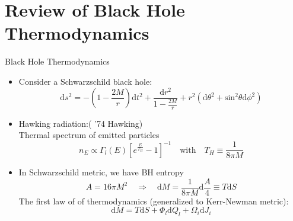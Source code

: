 \documentclass{beamer}
\begin{document}
\section{Review of Black Hole Thermodynamics}
\begin{frame}{Black Hole Thermodynamics}
    \begin{itemize}
        \item Consider a Schwarzschild black hole:
        \begin{equation*}
            \mathrm{d}s^2=-\left(1-\frac{2M}{r}\right)\mathrm{d}t^2+\frac{\mathrm{d}r^2}{1-\frac{2M}{r}}+r^2(\mathrm{d}\theta^2+\mathrm{sin}^2\theta\mathrm{d}\phi^2)
        \end{equation*}
        \item Hawking radiation:{\color{blue}( '74 Hawking)}\\
        Thermal spectrum of emitted particles
        \begin{equation*}
            n_E\propto\Gamma_l(E)\left[e^{\frac{E}{T_H}}-1\right]^{-1}\quad \text{with}\quad T_H\equiv\frac{1}{8\pi M}
        \end{equation*}
        \item In Schwarzschild metric, we have BH entropy
        \begin{equation*}
            A=16\pi M^2\quad\Rightarrow\quad \mathrm{d}M=\frac{1}{8\pi M}\mathrm{d}\frac{A}{4}\equiv T\mathrm{d}S
        \end{equation*}
        The first law of of thermodynamics (generalized to Kerr-Newman metric):
        \begin{equation*}
            \mathrm{d}M=T\mathrm{d}S+\Phi_l\mathrm{d}Q_l+\Omega_i\mathrm{d}J_i
        \end{equation*}
    \end{itemize}
\end{frame}
\end{document}
